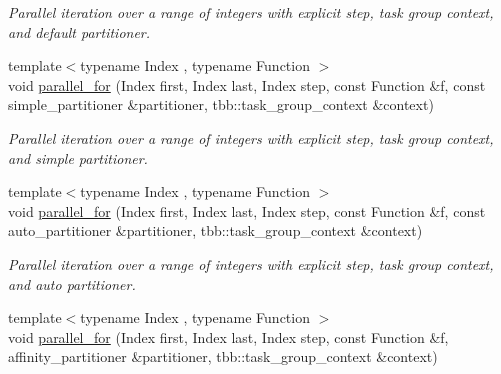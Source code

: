 \begin{DoxyCompactItemize}
\begin{DoxyCompactList}\small\item\em Parallel iteration over a range of integers with explicit step, task group context, and default partitioner. \end{DoxyCompactList}\item 
\hypertarget{namespacetbb_1_1strict__ppl_aa39783dac0e319c375590d160fa785e3}{}{\footnotesize template$<$typename Index , typename Function $>$ }\\void \hyperlink{namespacetbb_1_1strict__ppl_aa39783dac0e319c375590d160fa785e3}{parallel\+\_\+for} (Index first, Index last, Index step, const Function \&f, const simple\+\_\+partitioner \&partitioner, tbb\+::task\+\_\+group\+\_\+context \&context)\label{namespacetbb_1_1strict__ppl_aa39783dac0e319c375590d160fa785e3}

\begin{DoxyCompactList}\small\item\em Parallel iteration over a range of integers with explicit step, task group context, and simple partitioner. \end{DoxyCompactList}\item 
\hypertarget{namespacetbb_1_1strict__ppl_abc876d67355fe19ee5c9d67e6b49e1c3}{}{\footnotesize template$<$typename Index , typename Function $>$ }\\void \hyperlink{namespacetbb_1_1strict__ppl_abc876d67355fe19ee5c9d67e6b49e1c3}{parallel\+\_\+for} (Index first, Index last, Index step, const Function \&f, const auto\+\_\+partitioner \&partitioner, tbb\+::task\+\_\+group\+\_\+context \&context)\label{namespacetbb_1_1strict__ppl_abc876d67355fe19ee5c9d67e6b49e1c3}

\begin{DoxyCompactList}\small\item\em Parallel iteration over a range of integers with explicit step, task group context, and auto partitioner. \end{DoxyCompactList}\item 
\hypertarget{namespacetbb_1_1strict__ppl_a9d0acdb7f973760cf7b32de2eb9a4df0}{}{\footnotesize template$<$typename Index , typename Function $>$ }\\void \hyperlink{namespacetbb_1_1strict__ppl_a9d0acdb7f973760cf7b32de2eb9a4df0}{parallel\+\_\+for} (Index first, Index last, Index step, const Function \&f, affinity\+\_\+partitioner \&partitioner, tbb\+::task\+\_\+group\+\_\+context \&context)\label{namespacetbb_1_1strict__ppl_a9d0acdb7f973760cf7b32de2eb9a4df0}


\end{DoxyCompactItemize}
